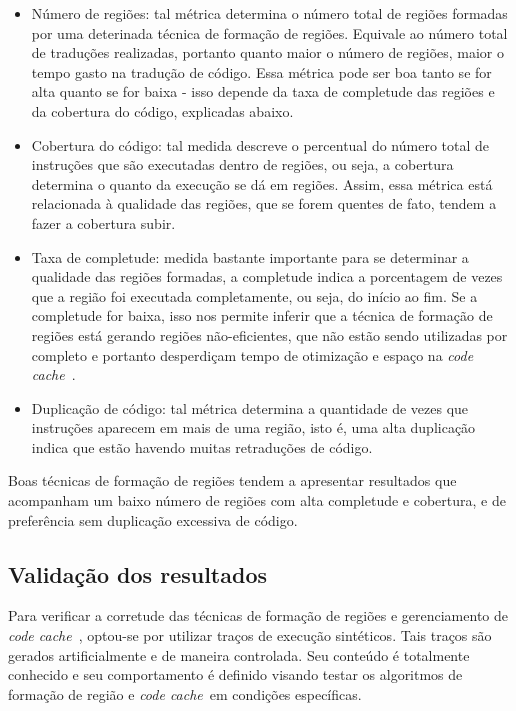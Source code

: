 \documentclass[12pt,twoside]{article}
\newcommand{\ccache}{\emph{code cache}}
\begin{document}
\begin{itemize}
\item Número de regiões: tal métrica determina o número total de regiões formadas por uma deterinada técnica de formação de regiões. Equivale ao número total de traduções realizadas, portanto quanto maior o número de regiões, maior o tempo gasto na tradução de código. Essa métrica pode ser boa tanto se for alta quanto se for baixa - isso depende da taxa de completude das regiões e da cobertura do código, explicadas abaixo.

\item Cobertura do código: tal medida descreve o percentual do número total de instruções que são executadas dentro de regiões, ou seja, a cobertura determina o quanto da execução se dá em regiões. Assim, essa métrica está relacionada à qualidade das regiões, que se forem quentes de fato, tendem a fazer a cobertura subir.

\item Taxa de completude: medida bastante importante para se determinar a qualidade das regiões formadas, a completude indica a porcentagem de vezes que a região foi executada completamente, ou seja, do início ao fim. Se a completude for baixa, isso nos permite inferir que a técnica de formação de regiões está gerando regiões não-eficientes, que não estão sendo utilizadas por completo e portanto desperdiçam tempo de otimização e espaço na \ccache~.

\item Duplicação de código: tal métrica determina a quantidade de vezes que instruções aparecem em mais de uma região, isto é, uma alta duplicação indica que estão havendo muitas retraduções de código.
\end{itemize}
Boas técnicas de formação de regiões tendem a apresentar resultados que acompanham um baixo número de regiões com alta completude e cobertura, e de preferência sem duplicação excessiva de código.


\subsection{Validação dos resultados}
Para verificar a corretude das técnicas de formação de regiões e gerenciamento de \ccache~, optou-se por utilizar traços de execução sintéticos. Tais traços são gerados artificialmente e de maneira controlada. Seu conteúdo é totalmente conhecido e seu comportamento é definido visando testar os algoritmos de formação de região e \ccache~em condições específicas.
\end{document}
